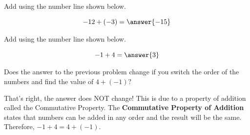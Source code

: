 \documentclass{ximera}[font=12pt]
\begin{document}
\begin{problem}
Add using the number line shown below.

\[ -12 + (-3) = \answer{-15} \]


\begin{center} 
\end{center}


\end{problem}


\begin{problem}
Add using the number line shown below.

\[ -1 + 4 =\answer{3} \]

\begin{center}
\end{center}
\end{problem}


\begin{problem}
Does the answer to the previous problem change if you switch the order of the numbers and find the value of $4 + (-1)?$

\begin{multipleChoice}
\end{multipleChoice}

\begin{feedback}[correct]
That's right, the answer does NOT change!  This is due to a property of addition called the Commutative Property.  
The \textbf{Commutative Property of Addition} states that numbers can be added in any order and the result will be the same.  Therefore, $-1 + 4 = 4 + (-1).$
\end{feedback}

\end{problem}
\end{document}
